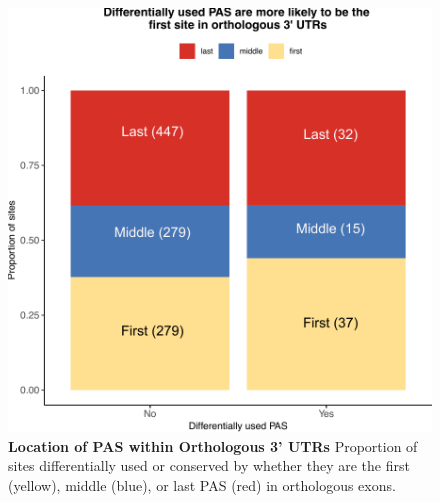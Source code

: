 \begin{figure}[!htb]
\centering
\includegraphics[width=5in]{img/ch03/Fig2-figSup2.pdf}
\caption[Location of PAS within Orthologous 3' UTRs]{\textbf{Location of PAS within Orthologous 3' UTRs} Proportion of sites differentially used or conserved by whether they are the first (yellow), middle (blue), or last PAS (red) in orthologous exons. }
\label{fig:ch03-whichUTR}
\end{figure}
\clearpage

